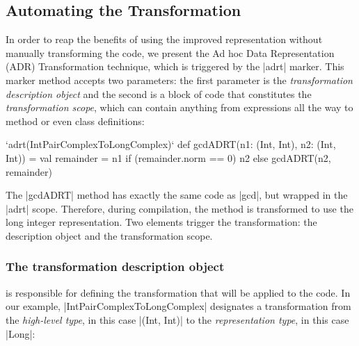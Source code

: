 \vspace{-0.6em}

\subsection{Automating the Transformation}
\label{sec:automating}

\vspace{-0.2em}

In order to reap the benefits of using the improved representation
without manually transforming the code, we present the Ad hoc Data
Representation (ADR) Transformation technique, which is triggered
by the |adrt| marker. This marker method accepts two parameters: the
first parameter is the \emph{transformation description object} and the
second is a block of code that constitutes the \emph{transformation scope}, which
can contain anything from expressions all the way to method or even class definitions:

\begin{lstlisting-nobreak}
`adrt(IntPairComplexToLongComplex)` {
  def gcdADRT(n1: (Int, Int), n2: (Int, Int)) = {
    val remainder = n1 %
    if (remainder.norm == 0) n2 else gcdADRT(n2, remainder)
  }
}
\end{lstlisting-nobreak}


The |gcdADRT| method has exactly the same code as |gcd|, but wrapped in the |adrt| scope. Therefore, during compilation, the method is transformed to use the long integer representation. Two elements trigger the transformation: the  description object and the transformation scope.

\subsubsection{The transformation description object} is responsible for defining the transformation that will be applied to the code. In our example, |IntPairComplexToLongComplex| designates a transformation from the \emph{high-level type}, in this case |(Int, Int)| to the \emph{representation type}, in this case |Long|:

